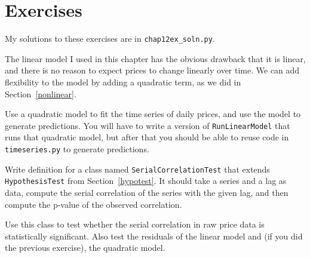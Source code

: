 \documentclass[12pt]{book}
\begin{document}
\section{Exercises}

My solutions to these exercises are in \verb"chap12ex_soln.py".

\begin{exercise}
The linear model I used in this chapter has the obvious drawback
that it is linear, and there is no reason to expect prices to
change linearly over time.
We can add flexibility to the model by adding a quadratic term,
as we did in Section~\ref{nonlinear}.  

Use a quadratic model to fit the time series of daily prices,
and use the model to generate predictions.  You will have to
write a version of {\tt RunLinearModel} that runs that quadratic
model, but after that you should be able to reuse code in
{\tt timeseries.py} to generate predictions.
\end{exercise}

\begin{exercise}
Write definition for a class named {\tt SerialCorrelationTest}
that extends {\tt HypothesisTest} from Section~\ref{hypotest}.
It should take a series and a lag as data, compute the serial
correlation of the series with the given lag, and then compute
the p-value of the observed correlation.

Use this class to test whether the serial correlation in raw
price data is statistically significant.  Also test the residuals
of the linear model and (if you did the previous exercise),
the quadratic model.
\end{exercise}
\end{document}

